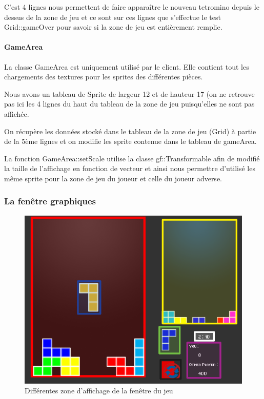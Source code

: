 \documentclass[a4paper, 12pt]{article}
\begin{document}
			C’est 4 lignes nous permettent de faire apparaître le nouveau tetromino depuis le dessus de la zone de jeu et ce sont sur ces lignes que s’effectue le test Grid::gameOver pour savoir si la zone de jeu est entièrement remplie.


			\paragraph{GameArea}

			La classe GameArea est uniquement utilisé par le client. Elle contient tout les chargements des textures pour les sprites des différentes pièces.

			Nous avons un tableau de Sprite de largeur 12 et de hauteur 17 (on ne retrouve pas ici les 4 lignes du haut du tableau de la zone de jeu puisqu’elles ne sont pas affichée.

			On récupère les données stocké dans le tableau de la zone de jeu (Grid) à partie de la 5ème lignes et on modifie les sprite contenue dans le tableau de gameArea.

			La fonction GameArea::setScale utilise la classe gf::Transformable afin de modifié la taille de l’affichage en fonction de vecteur et ainsi nous permettre d’utilisé les même sprite pour la zone de jeu du joueur et celle du joueur adverse.


		\subsubsection{La fenêtre graphiques}

			\begin{figure}[bt]
				\centering
				\includegraphics[scale=0.35]{img/fenetre.png}
				\caption{Différentes zone d'affichage de la fenêtre du jeu}
				\label{fig:fen}
			\end{figure}
\end{document}
